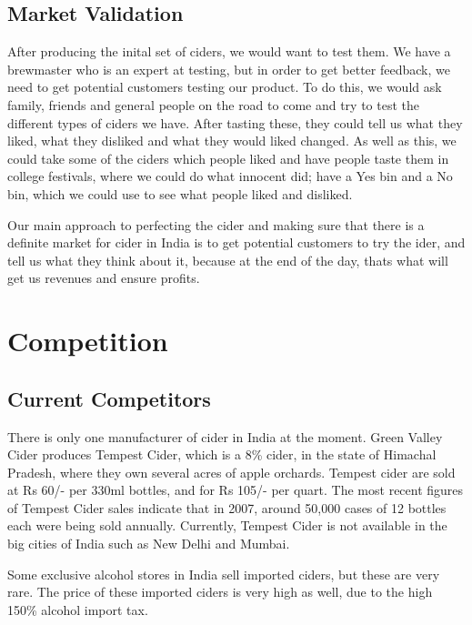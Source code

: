\documentclass[11pt]{article}
\begin{document}
  \subsection{Market Validation}
After producing the inital set of ciders, we would want to test them. We have
a brewmaster who is an expert at testing, but in order to get better feedback,
we need to get potential customers testing our product. To do this, we would
ask family, friends and general people on the road to come and try to test
the different types of ciders we have. After tasting these, they could tell us
what they liked, what they disliked and what they would liked changed.
As well as this, we could take some of the ciders which people liked and have
people taste them in college festivals, where we could do what innocent did;
have a Yes bin and a No bin, which we could use to see what people liked and
disliked.

Our main approach to perfecting the cider and making sure that there is a
definite market for cider in India is to get potential customers to try the
ider, and tell us what they think about it, because at the end of the day, thats
what will get us revenues and ensure profits.

\newpage


\section{Competition}
	\subsection{Current Competitors}
There is only one manufacturer of cider in India at the moment. Green Valley
Cider produces Tempest Cider, which is a 8\% cider, in the state of Himachal
Pradesh, where they own several acres of apple orchards. Tempest cider are sold
at Rs 60/- per 330ml bottles, and for Rs 105/- per quart. The most recent
figures of Tempest Cider sales indicate that in 2007, around 50,000 cases of 12
bottles each were being sold annually. Currently, Tempest Cider is not available
in the big cities of India such as New Delhi and Mumbai.

Some exclusive alcohol stores in India sell imported ciders, but these are very
rare. The price of these imported ciders is very high as well, due to the high
150\% alcohol import tax.
\end{document}
